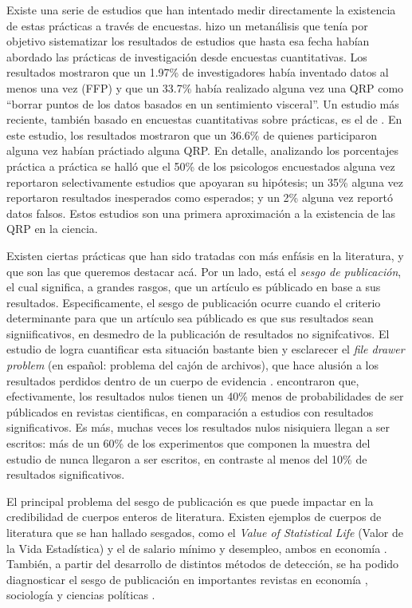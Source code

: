 \documentclass[
]{book}
\begin{document}
Existe una serie de estudios que han intentado medir directamente la existencia de estas prácticas a través de encuestas. \citet{fanelli_How_2009} hizo un metanálisis que tenía por objetivo sistematizar los resultados de estudios que hasta esa fecha habían abordado las prácticas de investigación desde encuestas cuantitativas. Los resultados mostraron que un 1.97\% de investigadores había inventado datos al menos una vez (FFP) y que un 33.7\% había realizado alguna vez una QRP como ``borrar puntos de los datos basados en un sentimiento visceral''. Un estudio más reciente, también basado en encuestas cuantitativas sobre prácticas, es el de \citet{john_Measuring_2012}. En este estudio, los resultados mostraron que un 36.6\% de quienes participaron alguna vez habían práctiado alguna QRP. En detalle, analizando los porcentajes práctica a práctica se halló que el 50\% de los psicologos encuestados alguna vez reportaron selectivamente estudios que apoyaran su hipótesis; un 35\% alguna vez reportaron resultados inesperados como esperados; y un 2\% alguna vez reportó datos falsos. Estos estudios son una primera aproximación a la existencia de las QRP en la ciencia.

Existen ciertas prácticas que han sido tratadas con más enfásis en la literatura, y que son las que queremos destacar acá. Por un lado, está el \emph{sesgo de publicación}, el cual significa, a grandes rasgos, que un artículo es públicado en base a sus resultados. Especificamente, el sesgo de publicación ocurre cuando el criterio determinante para que un artículo sea públicado es que sus resultados sean signiificativos, en desmedro de la publicación de resultados no signifcativos. El estudio de \citet{franco_Publication_2014} logra cuantificar esta situación bastante bien y esclarecer el \emph{file drawer problem} (en español: problema del cajón de archivos), que hace alusión a los resultados perdidos dentro de un cuerpo de evidencia \citep[p.39]{christensen_Transparent_2019}. \citet{franco_Publication_2014} encontraron que, efectivamente, los resultados nulos tienen un 40\% menos de probabilidades de ser públicados en revistas cientificas, en comparación a estudios con resultados significativos. Es más, muchas veces los resultados nulos nisiquiera llegan a ser escritos: más de un 60\% de los experimentos que componen la muestra del estudio de \citet{franco_Publication_2014} nunca llegaron a ser escritos, en contraste al menos del 10\% de resultados significativos.

El principal problema del sesgo de publicación es que puede impactar en la credibilidad de cuerpos enteros de literatura. Existen ejemplos de cuerpos de literatura que se han hallado sesgados, como el \emph{Value of Statistical Life} (Valor de la Vida Estadística) y el de salario mínimo y desempleo, ambos en economía \citep[para detalle ver p.42 y p.46 en][]{christensen_Transparent_2019}. También, a partir del desarrollo de distintos métodos de detección, se ha podido diagnosticar el sesgo de publicación en importantes revistas en economía \citet{brodeur_Star_2016}, sociología y ciencias políticas \citep{gerber_Publication_2008, gerber_Statistical_2008}.
\end{document}
